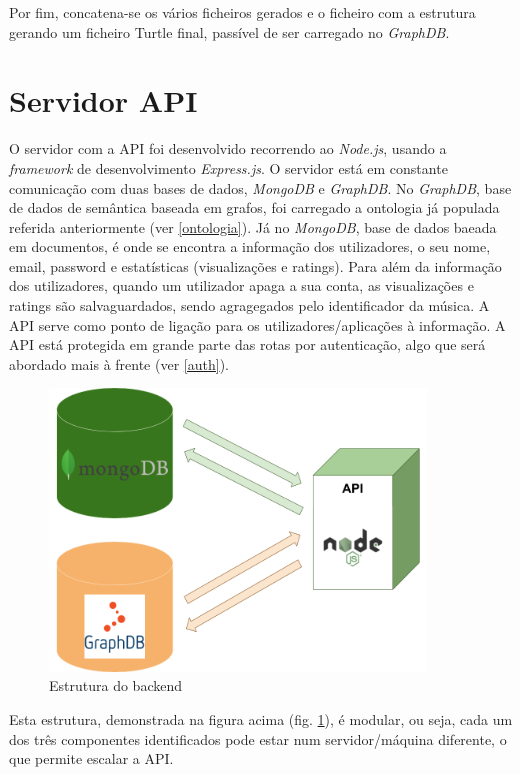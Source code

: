 \documentclass{article}
\begin{document}
Por fim, concatena-se os vários ficheiros gerados e o ficheiro com a estrutura gerando um ficheiro Turtle final, passível de ser carregado no \textit{GraphDB}.

\section{Servidor API}

O servidor com a API foi desenvolvido recorrendo ao \textit{Node.js}, usando a \textit{framework} de desenvolvimento \textit{Express.js}. O servidor está em constante comunicação com duas bases de dados, \textit{MongoDB} e \textit{GraphDB}. No \textit{GraphDB}, base de dados de semântica baseada em grafos, foi carregado a ontologia já populada referida anteriormente (ver \ref{ontologia}). Já no \textit{MongoDB}, base de dados baeada em documentos, é onde se encontra a informação dos utilizadores, o seu nome, email, password e estatísticas (visualizações e ratings). Para além da informação dos utilizadores, quando um utilizador apaga a sua conta, as visualizações e ratings são salvaguardados, sendo agragegados pelo identificador da música. A API serve como ponto de ligação para os utilizadores/aplicações à informação. A API está protegida em grande parte das rotas por autenticação, algo que será abordado mais à frente (ver \ref{auth}).

\begin{figure}[H]
    \centering
    \includegraphics[width=10cm]{Pictures/backend.png}
    \caption{Estrutura do backend}
    \label{backend}
\end{figure}

Esta estrutura, demonstrada na figura acima (fig. \ref{backend}), é modular, ou seja, cada um dos três componentes identificados pode estar num servidor/máquina diferente, o que permite escalar a API.
\end{document}

